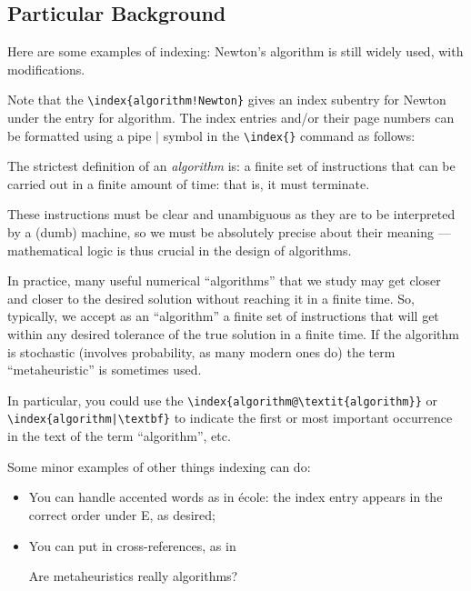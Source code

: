 \subsection{Particular Background}\label{SS.xyz}

Here are some examples of indexing: Newton's algorithm is
still widely used, with modifications.

Note that the \verb|\index{algorithm!Newton}| gives an index subentry for Newton under the entry for algorithm.
The index entries and/or their page numbers can be formatted using a pipe $|$ symbol in the \verb!\index{}!
command as follows:

\begin{defn}
The strictest definition of an \emph{algorithm} is: a finite set of instructions
that can be carried out in a finite amount of time: that is, it must terminate.

These instructions must be clear and unambiguous as they are to be interpreted by a (dumb)
machine, so we must be absolutely precise about their meaning --- mathematical logic is
thus crucial in the design of algorithms.
\end{defn}

In practice, many useful numerical ``algorithms'' that we study may get closer and closer
to the desired solution without reaching it in a finite time.  So, typically, we accept as an
``algorithm'' a finite set of instructions that will get within any desired tolerance
of the true solution in a finite time.
If the algorithm is stochastic (involves probability, as many modern ones do) the term
``metaheuristic'' is sometimes used.

In particular, you could use the \verb|\index{algorithm@\textit{algorithm}}| or \verb!\index{algorithm|\textbf}! to
indicate the first or most important occurrence in the text of the term ``algorithm'', etc.

Some minor examples of other things indexing can do:
\begin{itemize}
\item You can handle accented words as in \'ecole: the index entry appears in the correct
order under E, as desired;
\item You can put in cross-references, as in

Are metaheuristics really algorithms?
\end{itemize}

